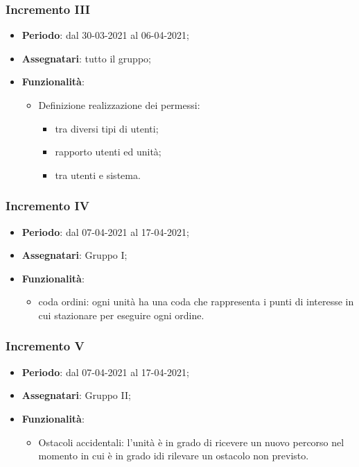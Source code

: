 \subsubsection{Incremento III}
\begin{itemize}
	\item \textbf{Periodo}: dal 30-03-2021 al 06-04-2021;
	\item \textbf{Assegnatari}: tutto il gruppo;
	\item \textbf{Funzionalità}:
	\begin{itemize}
		\item Definizione  realizzazione dei permessi:
		\begin{itemize}
			\item tra diversi tipi di utenti;
			\item rapporto utenti ed unità;
			\item tra utenti e sistema.
		\end{itemize}
	\end{itemize}
\end{itemize}


 \subsubsection{Incremento IV}
\begin{itemize}
	\item \textbf{Periodo}: dal 07-04-2021 al 17-04-2021;
	\item \textbf{Assegnatari}: Gruppo I;
	\item \textbf{Funzionalità}:
	\begin{itemize}
	\item coda ordini: ogni unità ha una coda che rappresenta i punti di interesse in cui stazionare per eseguire ogni ordine.
	\end{itemize}
\end{itemize}

 \subsubsection{Incremento V}
\begin{itemize}
	\item \textbf{Periodo}: dal 07-04-2021 al 17-04-2021;
	\item \textbf{Assegnatari}: Gruppo II;
	\item \textbf{Funzionalità}:
	\begin{itemize}
		\item Ostacoli accidentali: l'unità è in grado di ricevere un nuovo percorso nel momento in cui è in grado idi rilevare un ostacolo non previsto.
	\end{itemize}
\end{itemize}
